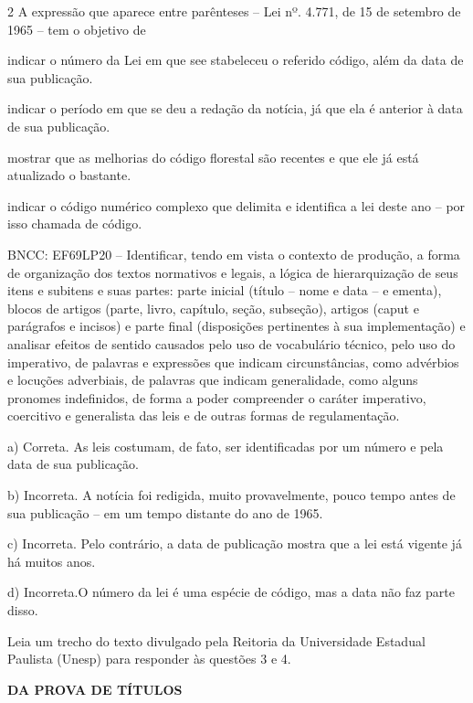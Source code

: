 \begin{escolha}
\begin{escolha}
\begin{escolha}
\begin{escolha}
\begin{escolha}
\num{2} A expressão que aparece entre parênteses -- Lei nº. 4.771, de 15
de setembro de 1965 -- tem o objetivo de

\begin{escolha}
\item indicar o número da Lei em que see stabeleceu o referido código,
além da data de sua publicação.

\item indicar o período em que se deu a redação da notícia, já que ela é
anterior à data de sua publicação.

\item mostrar que as melhorias do código florestal são recentes e que ele
já está atualizado o bastante.

\item indicar o código numérico complexo que delimita e identifica a lei
deste ano -- por isso chamada de código.
\end{escolha}

BNCC: EF69LP20 -- Identificar, tendo em vista o contexto de produção, a
forma de organização dos textos normativos e legais, a lógica de
hierarquização de seus itens e subitens e suas partes: parte inicial
(título -- nome e data -- e ementa), blocos de artigos (parte, livro,
capítulo, seção, subseção), artigos (caput e parágrafos e incisos) e
parte final (disposições pertinentes à sua implementação) e analisar
efeitos de sentido causados pelo uso de vocabulário técnico, pelo uso do
imperativo, de palavras e expressões que indicam circunstâncias, como
advérbios e locuções adverbiais, de palavras que indicam generalidade,
como alguns pronomes indefinidos, de forma a poder compreender o caráter
imperativo, coercitivo e generalista das leis e de outras formas de
regulamentação.

a) Correta. As leis costumam, de fato, ser identificadas por um número e
pela data de sua publicação.

b) Incorreta. A notícia foi redigida, muito provavelmente, pouco tempo
antes de sua publicação -- em um tempo distante do ano de 1965.

c) Incorreta. Pelo contrário, a data de publicação mostra que a lei está
vigente já há muitos anos.

d) Incorreta.O número da lei é uma espécie de código, mas a data não faz
parte disso.

Leia um trecho do texto divulgado pela Reitoria da Universidade Estadual
Paulista (Unesp) para responder às questões 3 e 4.

\textbf{DA PROVA DE TÍTULOS}


\end{escolha}
\end{escolha}
\end{escolha}
\end{escolha}
\end{escolha}
